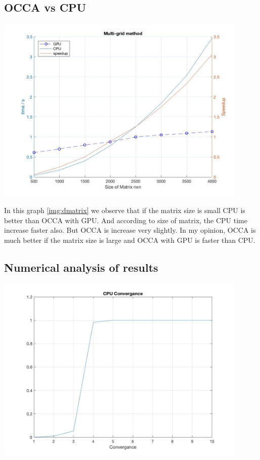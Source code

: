\subsection{OCCA vs CPU}
\begin{center}
	\includegraphics[width = 12cm]{Chapters/multigrid.jpg}
	\label{img:dmatrix}
\end{center}



In this graph \ref{img:dmatrix} we observe that if the matrix size is small CPU is better than OCCA with GPU. And according to size of matrix, the CPU time increase faster also. But OCCA is increase very slightly. In my opinion, OCCA is much better if the  matrix size is large and OCCA with GPU is faster than CPU. 

\subsection{Numerical analysis of results}
\begin{center}
	\includegraphics[width = 12cm]{Chapters/cpu_convergence_dense}
	\label{img:convergenceDense}
\end{center}

